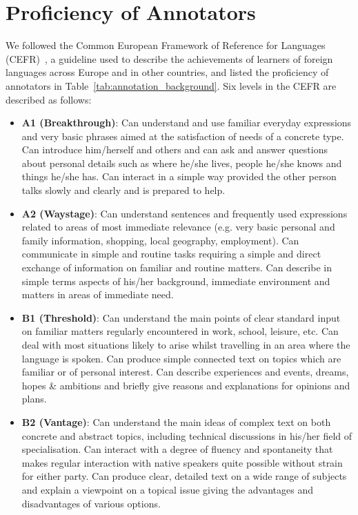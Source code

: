 \documentclass{article}
\theoremstyle{plain}
\theoremstyle{definition}
\theoremstyle{remark}
\begin{document}
\section{Proficiency of Annotators}\label{appx:proficiency}
We followed the Common European Framework of Reference for Languages (CEFR)~\citep{coe_cefr_levels}, a guideline used to describe the achievements of learners of foreign languages across Europe and in other countries, and listed the proficiency of annotators in Table~\ref{tab:annotation_background}. Six levels in the CEFR are described as follows:
\begin{itemize}
    \item \textbf{A1 (Breakthrough)}: Can understand and use familiar everyday expressions and very basic phrases aimed at the satisfaction of needs of a concrete type. Can introduce him/herself and others and can ask and answer questions about personal details such as where he/she lives, people he/she knows and things he/she has. Can interact in a simple way provided the other person talks slowly and clearly and is prepared to help.
    \item \textbf{A2 (Waystage)}: Can understand sentences and frequently used expressions related to areas of most immediate relevance (e.g. very basic personal and family information, shopping, local geography, employment). Can communicate in simple and routine tasks requiring a simple and direct exchange of information on familiar and routine matters.  Can describe in simple terms aspects of his/her background, immediate environment and matters in areas of immediate need.
    \item \textbf{B1 (Threshold)}: Can understand the main points of clear standard input on familiar matters regularly encountered in work, school, leisure, etc. Can deal with most situations likely to arise whilst travelling in an area where the language is spoken.  Can produce simple connected text on topics which are familiar or of personal interest. Can describe experiences and events, dreams, hopes \& ambitions and briefly give reasons and explanations for opinions and plans.
    \item \textbf{B2 (Vantage)}: Can understand the main ideas of complex text on both concrete and abstract topics, including technical discussions in his/her field of specialisation. Can interact with a degree of fluency and spontaneity that makes regular interaction with native speakers quite possible without strain for either party. Can produce clear, detailed text on a wide range of subjects and explain a viewpoint on a topical issue giving the advantages and disadvantages of various options.

\end{itemize}
\end{document}
